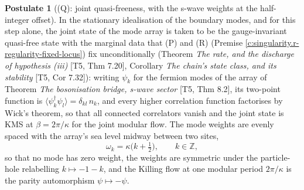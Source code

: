 \documentclass[11pt]{article}
\theoremstyle{definition}
\newtheorem{postulate}[theorem]{Postulate}
\theoremstyle{plain}
\providecommand{\Z}{}\renewcommand{\Z}{\mathbb{Z}}
\begin{document}
\begin{postulate}[(Q): joint quasi-freeness, with the s-wave weights at the half-integer offset]\label{c:singularity.q-joint-quasi-freeness-s-wave}
In the stationary idealisation of the boundary modes, and for this step alone, the joint state of the mode array is taken to be the gauge-invariant quasi-free state with the marginal data that (P) and (R) (Premise \ref{c:singularity.r-regularity-fixed-locus}) fix unconditionally (Theorem \emph{The rate, and the discharge of hypothesis (iii)} [T5, Thm 7.20], Corollary \emph{The chain's state class, and its stability} [T5, Cor 7.32]): writing $\psi_k$ for the fermion modes of the array of Theorem \emph{The bosonisation bridge, s-wave sector} [T5, Thm 8.2], its two-point function is $\langle \psi^\dagger_k \psi_l \rangle = \delta_{kl}\,n_k$, and every higher correlation function factorises by Wick's theorem, so that all connected correlators vanish and the joint state is KMS at $\beta = 2\pi/\kappa$ for the joint modular flow. The mode weights are evenly spaced with the array's sea level midway between two sites,
\[
\omega_k = \kappa\bigl(k + \tfrac12\bigr), \qquad k \in \Z ,
\]
so that no mode has zero weight, the weights are symmetric under the particle-hole relabelling $k \mapsto -1-k$, and the Killing flow at one modular period $2\pi/\kappa$ is the parity automorphism $\psi \mapsto -\psi$.


\end{postulate}
\end{document}
